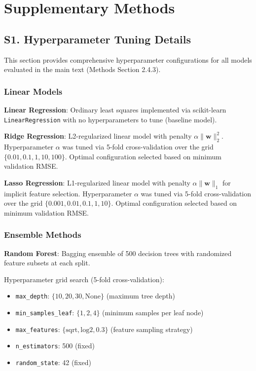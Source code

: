 \section*{Supplementary Methods}

\subsection*{S1. Hyperparameter Tuning Details}

This section provides comprehensive hyperparameter configurations for all models evaluated in the main text (Methods Section 2.4.3).

\subsubsection*{Linear Models}

\textbf{Linear Regression}: Ordinary least squares implemented via scikit-learn \texttt{LinearRegression} with no hyperparameters to tune (baseline model).

\textbf{Ridge Regression}: L2-regularized linear model with penalty $\alpha\|\mathbf{w}\|_2^2$. Hyperparameter $\alpha$ was tuned via 5-fold cross-validation over the grid $\{0.01, 0.1, 1, 10, 100\}$. Optimal configuration selected based on minimum validation RMSE.

\textbf{Lasso Regression}: L1-regularized linear model with penalty $\alpha\|\mathbf{w}\|_1$ for implicit feature selection. Hyperparameter $\alpha$ was tuned via 5-fold cross-validation over the grid $\{0.001, 0.01, 0.1, 1, 10\}$. Optimal configuration selected based on minimum validation RMSE.

\subsubsection*{Ensemble Methods}

\textbf{Random Forest}: Bagging ensemble of 500 decision trees with randomized feature subsets at each split.

Hyperparameter grid search (5-fold cross-validation):
\begin{itemize}
    \item \texttt{max\_depth}: $\{10, 20, 30, \text{None}\}$ (maximum tree depth)
    \item \texttt{min\_samples\_leaf}: $\{1, 2, 4\}$ (minimum samples per leaf node)
    \item \texttt{max\_features}: $\{\text{sqrt}, \text{log2}, 0.3\}$ (feature sampling strategy)
    \item \texttt{n\_estimators}: 500 (fixed)
    \item \texttt{random\_state}: 42 (fixed)
\end{itemize}

